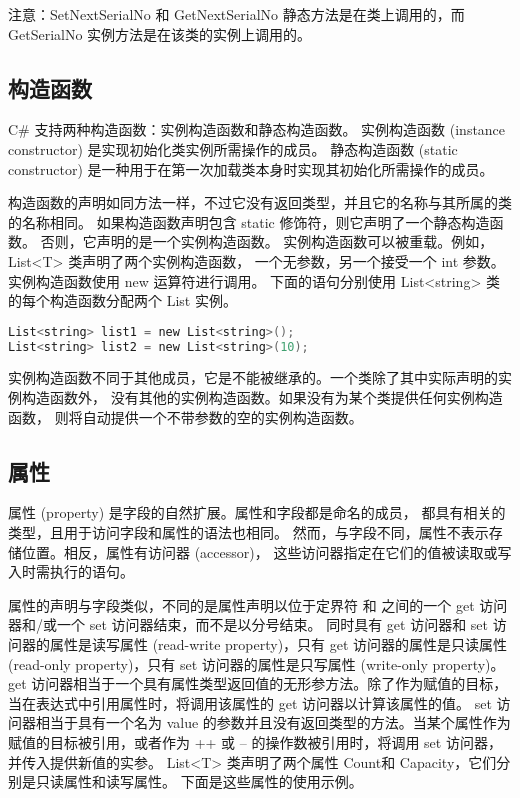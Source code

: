 注意：SetNextSerialNo 和 GetNextSerialNo 静态方法是在类上调用的，而 GetSerialNo 实例方法是在该类的实例上调用的。


\subsection{构造函数}
C\# 支持两种构造函数：实例构造函数和静态构造函数。
实例构造函数 (instance constructor) 是实现初始化类实例所需操作的成员。
静态构造函数 (static constructor) 是一种用于在第一次加载类本身时实现其初始化所需操作的成员。

构造函数的声明如同方法一样，不过它没有返回类型，并且它的名称与其所属的类的名称相同。
如果构造函数声明包含 static 修饰符，则它声明了一个静态构造函数。
否则，它声明的是一个实例构造函数。
实例构造函数可以被重载。例如，List<T> 类声明了两个实例构造函数，
一个无参数，另一个接受一个 int 参数。实例构造函数使用 new 运算符进行调用。
下面的语句分别使用 List<string> 类的每个构造函数分配两个 List 实例。

 \begin{lstlisting}[language=C] 
List<string> list1 = new List<string>();
List<string> list2 = new List<string>(10);
 \end{lstlisting}

实例构造函数不同于其他成员，它是不能被继承的。一个类除了其中实际声明的实例构造函数外，
没有其他的实例构造函数。如果没有为某个类提供任何实例构造函数，
则将自动提供一个不带参数的空的实例构造函数。

\subsection{属性}

属性 (property) 是字段的自然扩展。属性和字段都是命名的成员，
都具有相关的类型，且用于访问字段和属性的语法也相同。
然而，与字段不同，属性不表示存储位置。相反，属性有访问器 (accessor)，
这些访问器指定在它们的值被读取或写入时需执行的语句。

属性的声明与字段类似，不同的是属性声明以位于定界符 { 和 } 之间的一个 get 访问器和/或一个 set 访问器结束，而不是以分号结束。
同时具有 get 访问器和 set 访问器的属性是读写属性 (read-write property)，只有 get 访问器的属性是只读属性 (read-only property)，只有 set 访问器的属性是只写属性 (write-only property)。
get 访问器相当于一个具有属性类型返回值的无形参方法。除了作为赋值的目标，当在表达式中引用属性时，将调用该属性的 get 访问器以计算该属性的值。
set 访问器相当于具有一个名为 value 的参数并且没有返回类型的方法。当某个属性作为赋值的目标被引用，或者作为 ++ 或 -- 的操作数被引用时，将调用 set 访问器，并传入提供新值的实参。
List<T> 类声明了两个属性 Count和 Capacity，它们分别是只读属性和读写属性。
下面是这些属性的使用示例。


